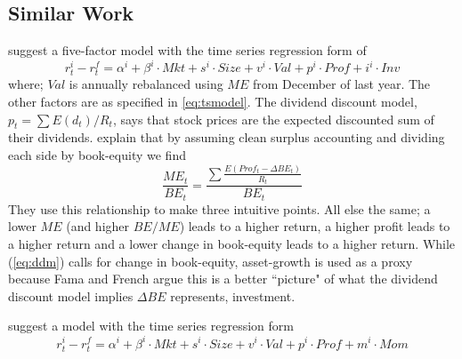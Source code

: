 
\subsection{Similar Work}

\textcite{fama2016choosing} suggest a five-factor model with the time series regression form of
\begin{equation}
\label{eq:tsFF2016}
r_t^i - r_t^f= \alpha^i + \beta^i \cdot Mkt + s^i \cdot Size + v^i \cdot Val + p^i \cdot Prof 
+ i^i \cdot Inv
\end{equation}
where; $Val$ is annually rebalanced using $ME$ from December of last year.
The other factors are as specified in \ref{eq:tsmodel}.
The dividend discount model, $p_t = \sum E(d_t)/R_t$, says that stock prices are the expected 
discounted sum of their dividends.
\textcite{fama2006profitability} explain that by assuming clean surplus accounting and 
dividing each side by book-equity we find
\begin{equation}
\label{eq:ddm}
\frac{ME_t}{BE_t} = \frac{\sum \frac{E(Prof_t-\Delta BE_t)}{R_t}}{BE_t}
\end{equation}
They use this relationship to make three intuitive points.
All else the same;
a lower $ME$ (and higher $BE/ME$) leads to a higher return,
a higher profit leads to a higher return and
a lower change in book-equity leads to a higher return.
While (\ref{eq:ddm}) calls for change in book-equity, asset-growth is used as a proxy because 
Fama and French argue this is a better ``picture" of what the dividend discount model implies 
$\Delta BE$ represents, investment.

\textcite{ball2016accruals} suggest a model with the time series regression form
\begin{equation}
\label{eq:tsBall2016}
r_t^i - r_t^f= \alpha^i + \beta^i \cdot Mkt + s^i \cdot Size + v^i \cdot Val + p^i \cdot Prof 
+ m^i \cdot Mom
\end{equation}

